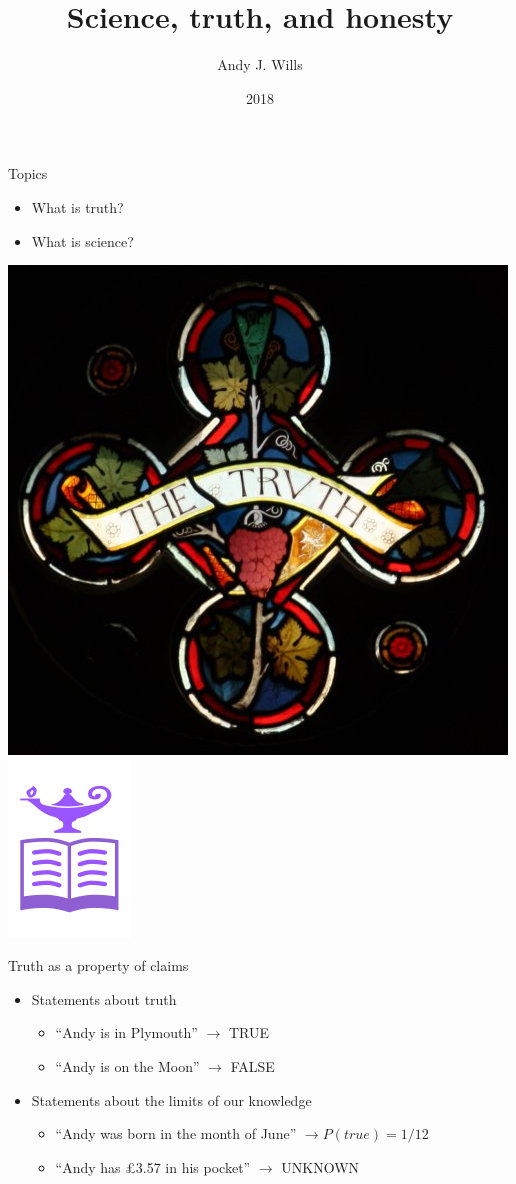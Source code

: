 \documentclass{beamer}
\title[Critical Thinking]{Science, truth, and honesty }
\author{Andy J. Wills}
\date{2018}
\begin{document}
\frame{\titlepage}

\begin{frame}{Topics}
	\begin{itemize}
		\item What is truth? 
		\item What is science?  
	\end{itemize}
	\centerline{
	\includegraphics[width=.3\textwidth]{pics/truth.jpg}
	\includegraphics[width=.3\textwidth]{pics/science.png}
	}
\end{frame}

\begin{frame}{Truth as a property of claims}
	\begin{itemize}
		\item Statements about truth
		\begin{itemize}
			\item ``Andy is in Plymouth'' $\to$ TRUE 
			\item ``Andy is on the Moon'' $\to$ FALSE 
		\end{itemize}
		\item Statements about the limits of our knowledge
		\begin{itemize}
			\item ``Andy was born in the month of June'' $\to P(true) = 1/12$ 
			\item ``Andy has \pounds 3.57 in his pocket'' $\to$ UNKNOWN
		\end{itemize}  
	\end{itemize}
\end{frame}
\end{document}
